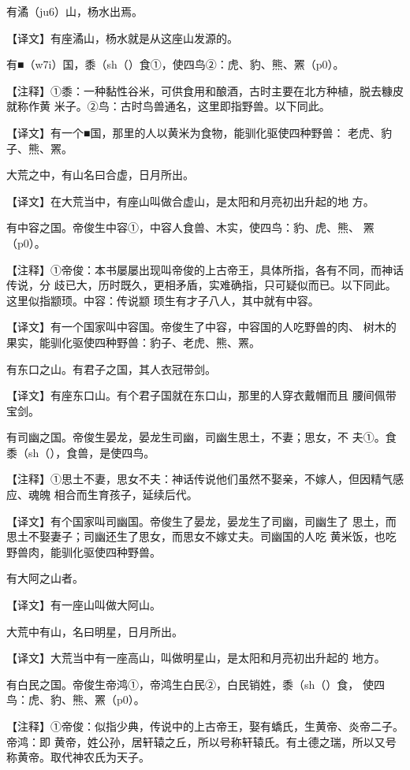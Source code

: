\documentclass[a4paper,12pt,UTF8,twoside]{ctexbook}
\begin{document}
有潏（ju6）山，杨水出焉。

【译文】有座潏山，杨水就是从这座山发源的。

有■（w7i）国，黍（sh（）食①，使四鸟②：虎、豹、熊、罴（p0）。

【注释】①黍：一种黏性谷米，可供食用和酿酒，古时主要在北方种植，脱去糠皮就称作黄 米子。②鸟：古时鸟兽通名，这里即指野兽。以下同此。

【译文】有一个■国，那里的人以黄米为食物，能驯化驱使四种野兽： 老虎、豹子、熊、罴。

大荒之中，有山名曰合虚，日月所出。

【译文】在大荒当中，有座山叫做合虚山，是太阳和月亮初出升起的地 方。

有中容之国。帝俊生中容①，中容人食兽、木实，使四鸟：豹、虎、熊、 罴（p0）。

【注释】①帝俊：本书屡屡出现叫帝俊的上古帝王，具体所指，各有不同，而神话传说，分 歧已大，历时既久，更相矛盾，实难确指，只可疑似而已。以下同此。这里似指颛顼。中容：传说颛 顼生有才子八人，其中就有中容。

【译文】有一个国家叫中容国。帝俊生了中容，中容国的人吃野兽的肉、 树木的果实，能驯化驱使四种野兽：豹子、老虎、熊、罴。

有东口之山。有君子之国，其人衣冠带剑。

【译文】有座东口山。有个君子国就在东口山，那里的人穿衣戴帽而且 腰间佩带宝剑。

有司幽之国。帝俊生晏龙，晏龙生司幽，司幽生思土，不妻；思女，不 夫①。食黍（sh（），食兽，是使四鸟。

【注释】①思土不妻，思女不夫：神话传说他们虽然不娶亲，不嫁人，但因精气感应、魂魄 相合而生育孩子，延续后代。

【译文】有个国家叫司幽国。帝俊生了晏龙，晏龙生了司幽，司幽生了 思土，而思土不娶妻子；司幽还生了思女，而思女不嫁丈夫。司幽国的人吃 黄米饭，也吃野兽肉，能驯化驱使四种野兽。

有大阿之山者。

【译文】有一座山叫做大阿山。

大荒中有山，名曰明星，日月所出。

【译文】大荒当中有一座高山，叫做明星山，是太阳和月亮初出升起的 地方。

有白民之国。帝俊生帝鸿①，帝鸿生白民②，白民销姓，黍（sh（）食， 使四鸟：虎、豹、熊、罴（p0）。

【注释】①帝俊：似指少典，传说中的上古帝王，娶有蟜氏，生黄帝、炎帝二子。帝鸿：即 黄帝，姓公孙，居轩辕之丘，所以号称轩辕氏。有土德之瑞，所以又号称黄帝。取代神农氏为天子。
\end{document}
